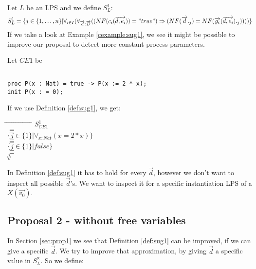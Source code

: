 \index{}\documentclass[a4paper,10pt]{article}
\theoremstyle{plain}
\theoremstyle{definition}
\newcommand{\ovr}{\overrightarrow}
\newcommand{\pps}{process parameters}
\newcommand{\tab}{\hspace*{5.mm} \= \hspace*{5.mm} \= \hspace*{5.mm} \= \hspace*{5.mm} \= \hspace*{5.mm} \= \hspace*{5.mm}  \= \hspace*{5.mm}  \= \hspace*{5.mm}  \= \hspace*{5.mm} \= \hspace*{5.mm} \= \hspace*{5.mm}  \= \hspace*{5.mm}  \= \hspace*{5.mm}\kill}
\begin{document}
\begin{defn} \label{def:sug1} Let $L$ be an LPS and we define $S_L^1$:
\begin{displaymath}
S_L^1 =
\lbrace   
j \in \lbrace 1, \ldots , n \rbrace \vert \forall_{i\in I} (\forall_{\ovr{d}: \ovr{D}}((NF(c_i(\ovr{d,e_i})) = "true")  \Rightarrow (NF(\ovr{d}._j) = NF(\ovr{g_i}(\ovr{d,e_i})._j))))\rbrace
\end{displaymath}
If we take a look at Example \ref{cexample:sug1}, we see it might be possible to improve our proposal to detect more constant \pps .
\begin{example}Let $CE1$ be \label{cexample:sug1}\begin{verbatim}

proc P(x : Nat) = true -> P(x := 2 * x);
init P(x : = 0);

\end{verbatim}
\end{example}
\begin{flushleft}
If we use Definition \ref{def:sug1}, we get:\\
\end{flushleft}
\begin{tabbing}
\tab
\> \> $S_{CE1}^1$\\
\> $\equiv$\\
\> \> $\lbrace j \in \lbrace 1 \rbrace \vert \forall_{x : Nat}( x = 2 \ast x ) \rbrace $\\
\> $\equiv$ \\
\> \> $\lbrace j \in \lbrace 1 \rbrace \vert false \rbrace $\\
\> $\equiv$ \\
\> \> $\emptyset$ \\
\end{tabbing}
In Definition \ref{def:sug1} it has to hold for every $\ovr{d}$, however
we don't want to inspect all possible $\ovr{d}$'s. We want to inspect it for a specific instantiation LPS of a $X(\ovr{v_0})$.
\end{defn}

\subsection{Proposal 2 - without free variables}
In Section \ref{sec:prop1} we see that Definition \ref{def:sug1} can be improved, if we can give a specific $\ovr{d}$. We try to improve that approximation, by giving $\ovr{d}$ a specific value in $S_L^2$. So we define: 
\end{document}
